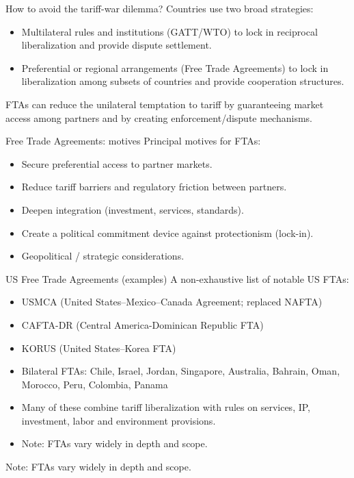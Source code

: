 \documentclass[notes,11pt, aspectratio=169, xcolor=table]{beamer}
\begin{document}
\begin{frame}{How to avoid the tariff-war dilemma?}
  Countries use two broad strategies:
  \begin{itemize}
    \item Multilateral rules and institutions (GATT/WTO) to lock in reciprocal liberalization and provide dispute settlement.
    \item Preferential or regional arrangements (Free Trade Agreements) to lock in liberalization among subsets of countries and provide cooperation structures.
  \end{itemize}
  FTAs can reduce the unilateral temptation to tariff by guaranteeing market access among partners and by creating enforcement/dispute mechanisms.
\end{frame}

\begin{frame}{Free Trade Agreements: motives}
  Principal motives for FTAs:
  \begin{itemize}
    \item Secure preferential access to partner markets.
    \item Reduce tariff barriers and regulatory friction between partners.
    \item Deepen integration (investment, services, standards).
    \item Create a political commitment device against protectionism (lock-in).
    \item Geopolitical / strategic considerations.
  \end{itemize}
\end{frame}

\begin{frame}{US Free Trade Agreements (examples)}
  A non-exhaustive list of notable US FTAs:
  \begin{itemize}
    \item USMCA (United States–Mexico–Canada Agreement; replaced NAFTA)
    \item CAFTA-DR (Central America-Dominican Republic FTA)
    \item KORUS (United States–Korea FTA)
    \item Bilateral FTAs: Chile, Israel, Jordan, Singapore, Australia, Bahrain, Oman, Morocco, Peru, Colombia, Panama
    \item Many of these combine tariff liberalization with rules on services, IP, investment, labor and environment provisions.
    \item Note: FTAs vary widely in depth and scope.
  \end{itemize}
  Note: FTAs vary widely in depth and scope.
\end{frame}
\end{document}
